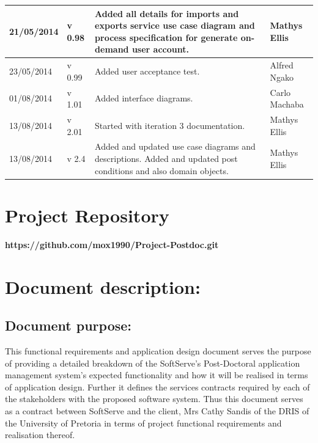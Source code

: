 \documentclass[12pt]{article}
\newcommand{\repo}{https://github.com/mox1990/Project-Postdoc.git}
\begin{document}
\begin{center}
\begin{tabular}{|l|p{1.4cm}|p{8cm}|p{2.8cm}|}
\hline
21/05/2014 & v 0.98 & Added all details for imports and exports service use case diagram and process specification for generate on-demand user account. & Mathys Ellis \\
\hline
23/05/2014 & v 0.99 & Added user acceptance test. & Alfred Ngako \\
\hline
01/08/2014 & v 1.01 & Added interface diagrams. & Carlo Machaba \\
\hline
13/08/2014 & v 2.01 & Started with iteration 3 documentation. & Mathys Ellis \\
\hline
13/08/2014 & v 2.4 & Added and updated use case diagrams and descriptions. Added and updated post conditions and also domain objects. & Mathys Ellis \\
\hline

\end{tabular}
\end{center}
\newpage
\tableofcontents

\listoffigures
\newpage
\section{Project Repository}
\textbf{\repo}
\newpage
\section{Document description:}

\subsection{Document purpose:}
\vspace{0.2in}
This functional requirements and application design document serves the purpose of providing a detailed breakdown of the SoftServe's Post-Doctoral application management system's expected functionality and how it will be realised in terms of application design. Further it defines the services contracts required by each of the stakeholders with the proposed software system. Thus this document serves as a contract between SoftServe and the client, Mrs Cathy Sandis of the DRIS of the University of Pretoria in terms of project functional requirements and realisation thereof.

\vspace{0.2in}
\end{document}

